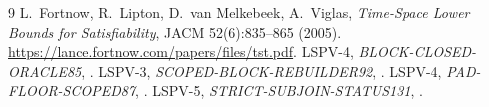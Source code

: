 \documentclass[11pt]{article}
\begin{document}
\begin{thebibliography}{9}
 L.~Fortnow, R.~Lipton, D.~van Melkebeek,
A.~Viglas, \emph{Time-Space Lower Bounds for Satisfiability},
JACM 52(6):835--865 (2005).
\url{https://lance.fortnow.com/papers/files/tst.pdf}.
 LSPV-4, \emph{BLOCK-CLOSED-ORACLE85},
.
 LSPV-3, \emph{SCOPED-BLOCK-REBUILDER92},
.
 LSPV-4, \emph{PAD-FLOOR-SCOPED87},
.
 LSPV-5, \emph{STRICT-SUBJOIN-STATUS131},
.
\end{thebibliography}
\end{document}
